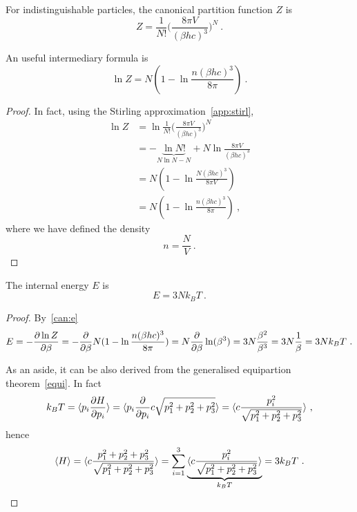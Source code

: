     For indistinguishable particles, the canonical partition function $Z$ is 
    \begin{equation*}
        Z = \frac{1}{N!} \Big (\frac{8\pi V}{(\beta h c)^3} \Big )^N ~.
    \end{equation*}

    An useful intermediary formula is 
    \begin{equation*}
        \ln Z = N (1 - \ln \frac{n (\beta h c)^3}{8\pi}) ~.
    \end{equation*}
    \begin{proof}
        In fact, using the Stirling approximation~\eqref{app:stirl},
        \begin{equation*}
        \begin{aligned}
            \ln Z & = \ln \frac{1}{N!} \Big (\frac{8\pi V}{(\beta h c)^3} \Big )^N \\ & = - \underbrace{\ln N!}_{N \ln N - N} + N \ln \frac{8\pi V}{(\beta h c)^3} \\ & = N (1 - \ln \frac{N (\beta h c)^3}{8\pi V}) \\ & = N (1 - \ln \frac{n (\beta h c)^3}{8\pi})  ~,
        \end{aligned}
        \end{equation*}
        where we have defined the density
        \begin{equation*}
            n = \frac{N}{V} ~.
        \end{equation*}
    \end{proof}
    
    The internal energy $E$ is 
    \begin{equation*}
        E = 3 N k_B T ~.
    \end{equation*}
    \begin{proof}
        By~\eqref{can:e}
        \begin{equation*}
            E = - \frac{\partial\ln Z}{\partial\beta} = - \frac{\partial}{\partial\beta} N (1 - \ln \frac{n (\beta h c)^3}{8\pi}) = N \frac{\partial}{\partial\beta} \ln (\beta^3) = 3 N \frac{\beta^2}{\beta^3} = 3 N \frac{1}{\beta} = 3 N k_B T ~.
        \end{equation*}

        As an aside, it can be also derived from the generalised equipartion theorem~\eqref{equi}. In fact
        \begin{equation*}
            k_B T = \langle p_i \frac{\partial H}{\partial p_i}\rangle = \langle p_i \frac{\partial}{\partial p_i} c \sqrt{p_1^2 + p_2^2 + p_3^2}\rangle = \langle c \frac{p_i^2}{\sqrt{p_1^2 + p_2^2 + p_3^2}}\rangle ~,
        \end{equation*}
        hence 
        \begin{equation*}
            \langle H\rangle = \langle c \frac{p_1^2 + p_2^2 + p_3^2}{\sqrt{p_1^2 + p_2^2 + p_3^2}}\rangle = \sum_{i=1}^3 \underbrace{\langle c \frac{p_i^2}{\sqrt{p_1^2 + p_2^2 + p_3^2}}\rangle}_{k_B T} = 3 k_B T ~.
        \end{equation*}
    \end{proof}
    
